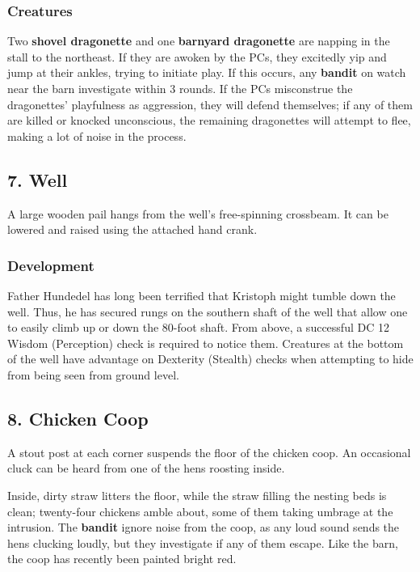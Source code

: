 \documentclass[10pt,a4paper,twoside,bg=print,twocolumn,openany,nodeprecatedcode]{dndbook}
\begin{document}
\subsubsection{Creatures}
Two \textbf{shovel dragonette} and one \textbf{barnyard dragonette} are napping in the stall to the northeast. If they are awoken by the PCs, they excitedly yip and jump at their ankles, trying to initiate play. If this occurs, any \textbf{bandit} on watch near the barn investigate within 3 rounds. If the PCs misconstrue the dragonettes' playfulness as aggression, they will defend themselves; if any of them are killed or knocked unconscious, the remaining dragonettes will attempt to flee, making a lot of noise in the process.

\subsection{7. Well}
\begin{DndReadAloud}{}
A large wooden pail hangs from the well's free-spinning crossbeam. It can be lowered and raised using the attached hand crank.

\end{DndReadAloud}

\subsubsection{Development}
Father Hundedel has long been terrified that Kristoph might tumble down the well. Thus, he has secured rungs on the southern shaft of the well that allow one to easily climb up or down the 80-foot shaft. From above, a successful DC 12 Wisdom (Perception) check is required to notice them. Creatures at the bottom of the well have advantage on Dexterity (Stealth) checks when attempting to hide from being seen from ground level.

\subsection{8. Chicken Coop}
\begin{DndReadAloud}{}
A stout post at each corner suspends the floor of the chicken coop. An occasional cluck can be heard from one of the hens roosting inside.

\end{DndReadAloud}

Inside, dirty straw litters the floor, while the straw filling the nesting beds is clean; twenty-four chickens amble about, some of them taking umbrage at the intrusion. The \textbf{bandit} ignore noise from the coop, as any loud sound sends the hens clucking loudly, but they investigate if any of them escape. Like the barn, the coop has recently been painted bright red.
\end{document}
